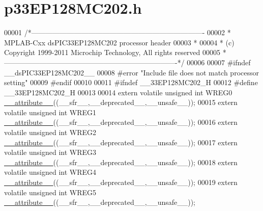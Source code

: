 \hypertarget{a00009_source}{\section{p33\+E\+P128\+M\+C202.\+h}
\label{a00009_source}
}

\begin{DoxyCode}
00001 \textcolor{comment}{/*-------------------------------------------------------------------------}
00002 \textcolor{comment}{ * MPLAB-Cxx  dsPIC33EP128MC202 processor header}
00003 \textcolor{comment}{ *}
00004 \textcolor{comment}{ * (c) Copyright 1999-2011 Microchip Technology, All rights reserved}
00005 \textcolor{comment}{ *-------------------------------------------------------------------------*/}
00006 
00007 \textcolor{preprocessor}{#ifndef \_\_dsPIC33EP128MC202\_\_}
00008 \textcolor{preprocessor}{#error "Include file does not match processor setting"}
00009 \textcolor{preprocessor}{#endif}
00010 
00011 \textcolor{preprocessor}{#ifndef \_\_33EP128MC202\_H}
00012 \textcolor{preprocessor}{#define \_\_33EP128MC202\_H}
00013 
00014 \textcolor{keyword}{extern} \textcolor{keyword}{volatile} \textcolor{keywordtype}{unsigned} \textcolor{keywordtype}{int}  WREG0 \hyperlink{a00009_a493c46f03454991ccc5aa7a6e1dfb2a7}{\_\_attribute\_\_}((\_\_sfr\_\_,\_\_deprecated\_\_,\_\_unsafe\_\_));
00015 \textcolor{keyword}{extern} \textcolor{keyword}{volatile} \textcolor{keywordtype}{unsigned} \textcolor{keywordtype}{int}  WREG1 \hyperlink{a00009_a493c46f03454991ccc5aa7a6e1dfb2a7}{\_\_attribute\_\_}((\_\_sfr\_\_,\_\_deprecated\_\_,\_\_unsafe\_\_));
00016 \textcolor{keyword}{extern} \textcolor{keyword}{volatile} \textcolor{keywordtype}{unsigned} \textcolor{keywordtype}{int}  WREG2 \hyperlink{a00009_a493c46f03454991ccc5aa7a6e1dfb2a7}{\_\_attribute\_\_}((\_\_sfr\_\_,\_\_deprecated\_\_,\_\_unsafe\_\_));
00017 \textcolor{keyword}{extern} \textcolor{keyword}{volatile} \textcolor{keywordtype}{unsigned} \textcolor{keywordtype}{int}  WREG3 \hyperlink{a00009_a493c46f03454991ccc5aa7a6e1dfb2a7}{\_\_attribute\_\_}((\_\_sfr\_\_,\_\_deprecated\_\_,\_\_unsafe\_\_));
00018 \textcolor{keyword}{extern} \textcolor{keyword}{volatile} \textcolor{keywordtype}{unsigned} \textcolor{keywordtype}{int}  WREG4 \hyperlink{a00009_a493c46f03454991ccc5aa7a6e1dfb2a7}{\_\_attribute\_\_}((\_\_sfr\_\_,\_\_deprecated\_\_,\_\_unsafe\_\_));
00019 \textcolor{keyword}{extern} \textcolor{keyword}{volatile} \textcolor{keywordtype}{unsigned} \textcolor{keywordtype}{int}  WREG5 \hyperlink{a00009_a493c46f03454991ccc5aa7a6e1dfb2a7}{\_\_attribute\_\_}((\_\_sfr\_\_,\_\_deprecated\_\_,\_\_unsafe\_\_));

\end{DoxyCode}
